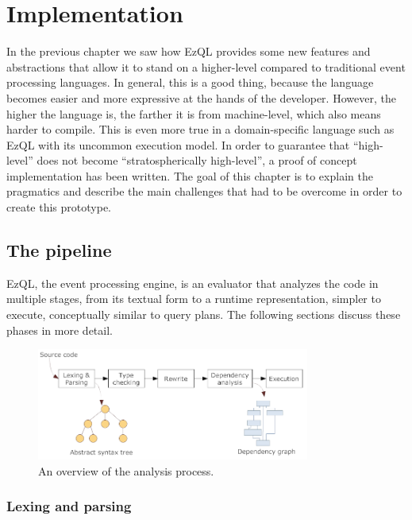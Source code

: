 \chapter{Implementation}
\label{chap:implementation}

In the previous chapter we saw how EzQL provides some new features and
abstractions that allow it to stand on a higher-level compared to
traditional event processing languages. In general, this is a good
thing, because the language becomes easier and more expressive at the
hands of the developer. However, the higher the language is, the
farther it is from machine-level, which also means harder to
compile. This is even more true in a domain-specific language such as
EzQL with its uncommon execution model. In order to guarantee that
``high-level'' does not become ``stratospherically high-level'', a proof
of concept implementation has been written. The goal of this chapter
is to explain the pragmatics and describe the main challenges that had
to be overcome in order to create this prototype.

\section{The pipeline}

EzQL, the event processing engine, is an evaluator that analyzes the
code in multiple stages, from its textual form to a runtime
representation, simpler to execute, conceptually similar to query
plans. The following sections discuss these phases in more detail.

\begin{figure} \centering
  \includegraphics[width=0.8\textwidth]{phases.png}
  \caption{An overview of the analysis process.}
  \label{fig:phases}
\end{figure}

\subsection{Lexing and parsing}
\label{sub:lexing-parsing}

